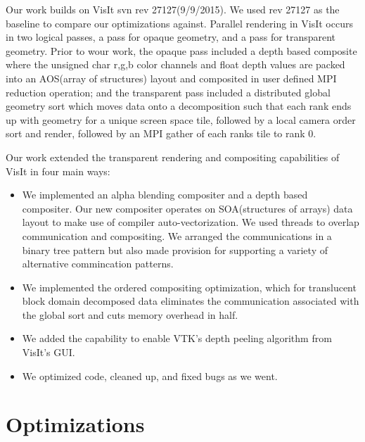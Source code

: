 \documentclass[a4paper,10pt]{report}
\begin{document}
Our work builds on VisIt svn rev 27127(9/9/2015). We used rev 27127 as the baseline to compare our optimizations against. Parallel rendering in VisIt occurs in two logical passes, a pass for opaque geometry, and a pass for transparent geometry. Prior to wour work, the opaque pass included a depth based composite where the unsigned char r,g,b color channels and float depth values are packed into an AOS(array of structures) layout and composited in user defined MPI reduction operation; and the transparent pass included a distributed global geometry sort which moves data onto a decomposition such that each rank ends up with geometry for a unique screen space tile, followed by a local camera order sort and render, followed by an MPI gather of each ranks tile to rank 0.

Our work extended the transparent rendering and compositing capabilities of VisIt in four main ways: 
\begin{itemize}
 \item We implemented an alpha blending compositer and a depth based compositer. Our new compositer operates on SOA(structures of arrays) data layout to make use of compiler auto-vectorization. We used threads to overlap communication and compositing. We arranged the communications in a binary tree pattern but also made provision for supporting a variety of alternative commincation patterns.
 \item We implemented the ordered compositing optimization, which for translucent block domain decomposed data eliminates the communication associated with the global sort and cuts memory overhead in half.
 \item We added the capability to enable VTK's depth peeling algorithm from VisIt's GUI.
 \item We optimized code, cleaned up, and fixed bugs as we went.
\end{itemize}

\section{Optimizations}
\end{document}
